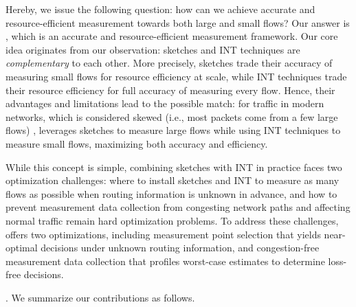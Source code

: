 Hereby, we issue the following question: how can we achieve accurate and resource-efficient measurement towards both large and small flows? Our answer is \sysname, which is an accurate and resource-efficient measurement framework. Our core idea originates from our observation: sketches and INT techniques are \emph{complementary} to each other. More precisely, sketches trade their accuracy of measuring small flows for resource efficiency at scale, while INT techniques trade their resource efficiency for full accuracy of measuring every flow. Hence, their advantages and limitations lead to the possible match: for traffic in modern networks, which is considered skewed (i.e., most packets come from a few large flows) \cite{roy2015inside,huang2021toward,caida,benson2010network,yang2018elastic}, \sysname leverages sketches to measure large flows while using INT techniques to measure small flows, maximizing both accuracy and efficiency.

While this concept is simple, combining sketches with INT in practice faces two optimization challenges: where to install sketches and INT to measure as many flows as possible when routing information is unknown in advance, and how to prevent measurement data collection from congesting network paths and affecting normal traffic remain hard optimization problems. 
To address these challenges, \sysname offers two optimizations, including measurement point selection that yields near-optimal decisions under unknown routing information, and congestion-free measurement data collection that profiles worst-case estimates to determine loss-free decisions. 



. 
We summarize our contributions as follows.  

